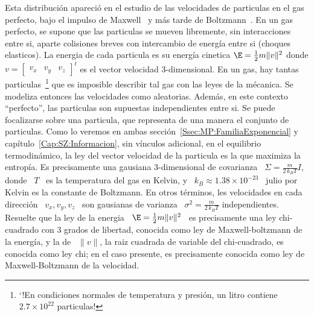 \begin{ejemplo}\label{Ej:MP:MaxwellBoltzmann}
  Esta distribuci\'on apareci\'o en el  estudio de las velocidades de particulas
  en el gas perfecto, bajo  el impulso de Maxwell~\cite{Max60A, Max60B, Max67} y
  m\'as tarde de  Boltzmann~\cite{Bol77, Bol96, Bol98}.  En un  gas perfecto, se
  supone que  las particulas se  mueven libremente, sin interacciones  entre si,
  aparte  colisiones  breves con  intercambio  de  energ\'ia  entre si  (choques
  elasticos).   La energia  de cada  particula es  su energ\'ia  cinetica  $\E =
  \frac12   m  \|   v  \|^2$   donde   $v  =   \begin{bmatrix}  v_x   &  v_y   &
    v_z\end{bmatrix}^t$ es  el vector velocidad  3-dimensional.  En un  gas, hay
  tantas  particulas~\footnote{`!En   condiciones  normales  de   temperatura  y
    presi\'on, un  litro contiene  \ $2.7 \times  10^{22}$ particulas!}   que es
  imposible  describir tal  gas con  las leyes  de la  m\'ecanica.   Se modeliza
  entonces  las  velocidades  como   aleatorias.   Adem\'as,  en  este  contexto
  ``perfecto'', las particulas son  supuestas independientes entre si.  Se puede
  focalizarse sobre una  particula, que representa de una  manera el conjunto de
  particulas.          Como          lo         veremos         en         ambas
  secci\'on~\ref{Ssec:MP:FamiliaExponencial}                                    y
  cap\'itulo~\ref{Cap:SZ:Informacion},   sin   v\'inculos   adicional,   en   el
  equilibrio termodin\'amico, la ley del  vector velocidad de la particula es la
  que  maximiza la  entrop\'ia. Es  precisamente una  gausiana  3-dimensional de
  covarianza  \  $\Sigma =  \frac{m}{2  \,  k_B  T} I$,  donde  \  $T$ \  es  la
  temperatura del gas en Kelvin, y  \ $k_B \approx 1.38 \times 10^{-23}$ \ julio
  por Kelvin es la constante  de Boltzmann. En otros t\'erminos, les velocidades
  en cada direcci\'on \ $v_x, v_y,  v_z$ \ son gausianas de varianza \ $\sigma^2
  = \frac{m}{2 \,  k_B T}$ independientes.  Resuelte que la ley  de la energia \
  $\E = \frac12 m \| v \|^2$ \ es precisamente una ley chi-cuadrado con 3 grados
  de libertad, conocida como ley de Maxwell-boltzmann de la energ\'ia, y la de \
  $\| v \|$, la raiz cuadrada de variable del chi-cuadrado, es conocida como ley
  chi;   en  el   caso  presente,   es   precisamente  conocida   como  ley   de
  Maxwell-Boltzmann de la velocidad.
\end{ejemplo}

